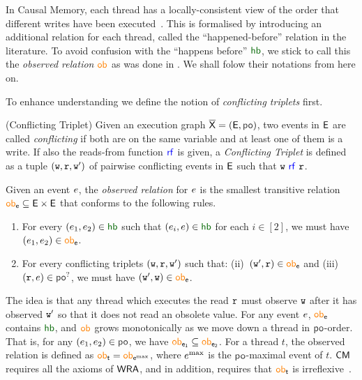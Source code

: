 In Causal Memory, each thread has a locally-consistent view of the order that different writes have been executed~\cite{Ahamad1995,BouajjaniEGH17}. 
This is formalised by introducing an additional relation for each thread, called the ``happened-before'' relation in the literature.  To avoid confusion with the ``happens before'' $\hb$, we stick to call this the \emph{observed relation} $\ob{}$ as was done in \cite{ChakrabortyKMP24}. We shall folow their notations from here on. 

To enhance understanding we define the notion of \emph{conflicting triplets} first.

\begin{definition}(Conflicting Triplet)
Given an execution graph $\expartial=(\E,\po)$, two events in $\mathsf{E}$ are called \emph{conflicting} if both are on the same variable and at least one of them is a write. If also the reads-from function $\rf$ is given, a \emph{Conflicting Triplet} is defined as a tuple $(\mathtt{w}, \mathtt{r}, \mathtt{w}')$ of pairwise conflicting events in $\mathsf{E}$ such that $\wt~\rf~\rd$. 
\end{definition} 
 
Given an event $e$, the \emph{observed relation} for $e$ is the smallest transitive relation $\ob{\event}\subseteq \E\times \E$ that conforms to the following rules. 

\begin{enumerate}
\item For every $(\event_1, \event_2)\in \hb$ such that $(\event_i, \event)\in \hb$ for each $i\in[2]$, we must have $(\event_1, \event_2)\in \ob{\event}$.
\item For every conflicting triplets $(\mathtt{w}, \mathtt{r}, \mathtt{w}')$ such that:
(ii)~$(\wt',\rd)\in \ob{\event}$ and
(iii)~$(\rd, \event)\in \po^?$,
we must have $(\wt', \wt)\in \ob{\event}$.
\end{enumerate}


The idea is that any thread which executes the read $\mathtt{r}$ must observe $\mathtt{w}$ 
after it has observed $\mathtt{w}'$ so that it does not read an obsolete value. 
For any event $e$, $\ob{\event}$ contains $\hb$, and $\ob{}$ grows monotonically as we move down a thread 
in $\po$-order. That is, for any $(\event_1, \event_2)\in \po$, we have $\ob{\event_1}\subseteq \ob{\event_2}$. For a thread $t$, the observed relation  is defined as $\ob{t}=\ob{\event^{\max}}$, where $e^{\max}$ is the $\po$-maximal event of $t$.  $\mathsf{CM}$ requires all the axioms of $\mathsf{WRA}$, and in addition, 
requires that $\ob{t}$ is irreflexive~\cite{BouajjaniEGH17}.  

